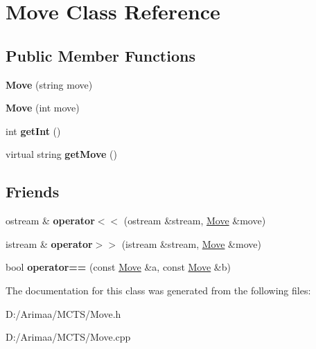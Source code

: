 \hypertarget{class_move}{\section{Move Class Reference}
\label{class_move}
}
\subsection*{Public Member Functions}
\begin{DoxyCompactItemize}
\item 
\hypertarget{class_move_aa834852fab62fb57ccca214904b08212}{{\bfseries Move} (string move)}\label{class_move_aa834852fab62fb57ccca214904b08212}

\item 
\hypertarget{class_move_ad570e8fbf1931e8d36ca437b1ee5f137}{{\bfseries Move} (int move)}\label{class_move_ad570e8fbf1931e8d36ca437b1ee5f137}

\item 
\hypertarget{class_move_ae87f41d72a55e856230a23335c78f408}{int {\bfseries get\+Int} ()}\label{class_move_ae87f41d72a55e856230a23335c78f408}

\item 
\hypertarget{class_move_aa3f4663baea580a66dcfaae3bad2e25e}{virtual string {\bfseries get\+Move} ()}\label{class_move_aa3f4663baea580a66dcfaae3bad2e25e}

\end{DoxyCompactItemize}
\subsection*{Friends}
\begin{DoxyCompactItemize}
\item 
\hypertarget{class_move_aa9bc270ff052e0e663feab7b49b66652}{ostream \& {\bfseries operator$<$$<$} (ostream \&stream, \hyperlink{class_move}{Move} \&move)}\label{class_move_aa9bc270ff052e0e663feab7b49b66652}

\item 
\hypertarget{class_move_a0217026ba3cfb5cee0c1e1ea6b580cf6}{istream \& {\bfseries operator$>$$>$} (istream \&stream, \hyperlink{class_move}{Move} \&move)}\label{class_move_a0217026ba3cfb5cee0c1e1ea6b580cf6}

\item 
\hypertarget{class_move_a59d8a3eae88b358f8d8039ec725b0ded}{bool {\bfseries operator==} (const \hyperlink{class_move}{Move} \&a, const \hyperlink{class_move}{Move} \&b)}\label{class_move_a59d8a3eae88b358f8d8039ec725b0ded}

\end{DoxyCompactItemize}


The documentation for this class was generated from the following files\+:\begin{DoxyCompactItemize}
\item 
D\+:/\+Arimaa/\+M\+C\+T\+S/Move.\+h\item 
D\+:/\+Arimaa/\+M\+C\+T\+S/Move.\+cpp\end{DoxyCompactItemize}
